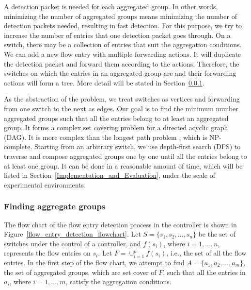 \documentclass[conference]{IEEEtran}
\begin{document}
A detection packet is needed for each aggregated group. In other words, minimizing the number of aggregated groups means minimizing the number of detection packets needed, resulting in fast detection. For this purpose, we try to increase the number of entries that one detection packet goes through. On a switch, there may be a collection of entries that suit the aggregation conditions. We can add a new flow entry with multiple forwarding actions. It will duplicate the detection packet and forward them according to the actions. Therefore, the switches on which the entries in an aggregated group are and their forwarding actions will form a tree. More detail will be stated in Section~\ref{Aggregated_group_finding}.

As the abstraction of the problem, we treat switches as vertices and forwarding from one switch to the next as edges. Our goal is to find the minimum number aggregated groups such that all the entries belong to at least an aggregated group. It forms a complex set covering problem for a directed acyclic graph (DAG). It is more complex than the longest path problem \cite{DMR97,RU04}, which is NP-complete. Starting from an arbitrary switch, we use depth-first search (DFS) to traverse and compose aggregated groups one by one until all the entries belong to at least one group. It can be done in a reasonable amount of time, which will be listed in Section~\ref{Implementation_and_Evaluation}, under the scale of experimental environments.

\subsubsection{Finding aggregate groups}
\label{Aggregated_group_finding}

The flow chart of the flow entry detection process in the controller is shown in Figure~\ref{flow_entry_detection_flowchart}. Let $S=\{s_1,s_2,\ldots,s_n\}$ be the set of switches under the control of a controller, and $f(s_i)$, where $i=1,\ldots,n$, represents the flow entries on $s_i$. Let $F=\cup_{i=1}^n f(s_i)$, i.e., the set of all the flow entries. In the first step of the flow chart, we attempt to find $A=\{a_1, a_2, \ldots, a_m\}$, the set of aggregated groups, which are set cover of $F$, such that all the entries in $a_i$, where $i=1,\ldots,m$, satisfy the aggregation conditions.
\end{document}
